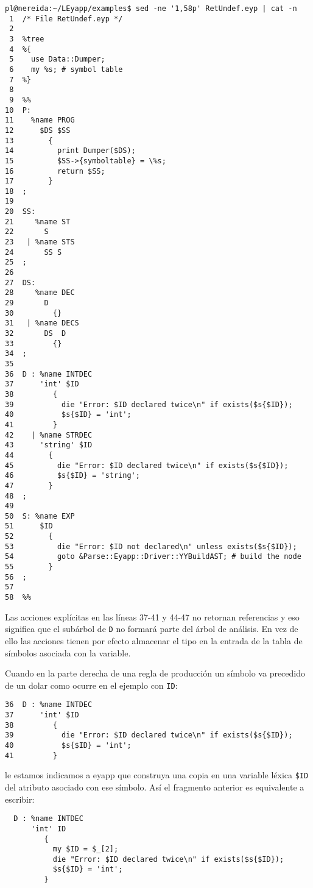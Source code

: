 \begin{verbatim}
pl@nereida:~/LEyapp/examples$ sed -ne '1,58p' RetUndef.eyp | cat -n
 1  /* File RetUndef.eyp */
 2
 3  %tree
 4  %{
 5    use Data::Dumper;
 6    my %s; # symbol table
 7  %}
 8
 9  %%
10  P:
11    %name PROG
12      $DS $SS
13        {
14          print Dumper($DS);
15          $SS->{symboltable} = \%s;
16          return $SS;
17        }
18  ;
19
20  SS:
21     %name ST
22       S
23   | %name STS
24       SS S
25  ;
26
27  DS:
28     %name DEC
29       D
30         {}
31   | %name DECS
32       DS  D
33         {}
34  ;
35
36  D : %name INTDEC
37      'int' $ID
38         {
39           die "Error: $ID declared twice\n" if exists($s{$ID});
40           $s{$ID} = 'int';
41         }
42    | %name STRDEC
43      'string' $ID
44        {
45          die "Error: $ID declared twice\n" if exists($s{$ID});
46          $s{$ID} = 'string';
47        }
48  ;
49
50  S: %name EXP
51      $ID
52        {
53          die "Error: $ID not declared\n" unless exists($s{$ID});
54          goto &Parse::Eyapp::Driver::YYBuildAST; # build the node
55        }
56  ;
57
58  %%
\end{verbatim}


Las acciones explícitas en las líneas 
37-41 y 44-47 no retornan referencias y eso significa 
que el subárbol de \verb|D| no formará parte del árbol de 
análisis. En vez de ello las acciones tienen por efecto
almacenar el tipo en la entrada de la tabla de símbolos
asociada con la variable.


Cuando en la parte derecha de una regla de producción un símbolo
va precedido de un dolar como ocurre en el ejemplo con \verb|ID|:

\begin{verbatim}
36  D : %name INTDEC
37      'int' $ID
38         {
39           die "Error: $ID declared twice\n" if exists($s{$ID});
40           $s{$ID} = 'int';
41         }
\end{verbatim}

le estamos indicamos a eyapp que construya una copia en una variable léxica \verb|$ID|
del atributo asociado con ese símbolo. Así el fragmento anterior es equivalente
a escribir:

\begin{verbatim}
  D : %name INTDEC
      'int' ID
         {
           my $ID = $_[2];
           die "Error: $ID declared twice\n" if exists($s{$ID});
           $s{$ID} = 'int';
         }
\end{verbatim}

